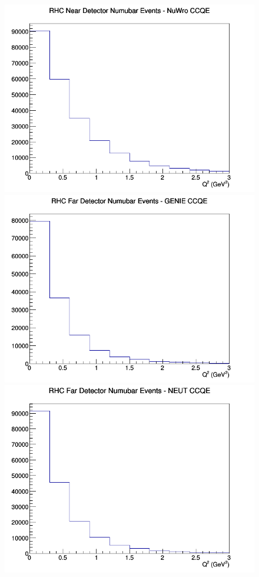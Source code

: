 \begin{figure}[h]
\includegraphics[width=\linewidth]{Q2/nominal/CCQE_RHC_ND_numubar_Q2_NuWro.png}
\endminipage
\newline
{}
\includegraphics[width=\linewidth]{Q2/nominal/CCQE_RHC_FD_numubar_Q2_GENIE.png}
\endminipage
{}
\includegraphics[width=\linewidth]{Q2/nominal/CCQE_RHC_FD_numubar_Q2_NEUT.png}

\end{figure}
